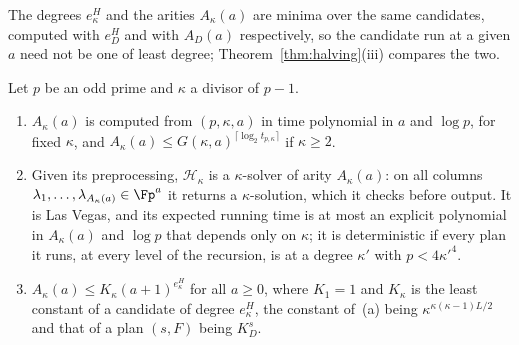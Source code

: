 The degrees $e^H_\kappa$ and the arities $A_\kappa(a)$ are minima over the same candidates, computed with $e^H_D$ and with $A_D(a)$ respectively, so the candidate run at a given $a$ need not be one of least degree; Theorem~\ref{thm:halving}(iii) compares the two.

\begin{theorem}[Schedule~1H]
\label{thm:halving}
Let $p$ be an odd prime and $\kappa$ a divisor of $p-1$.
\begin{enumerate}[label=\textup{(\roman*)},leftmargin=2em]
  \item $A_\kappa(a)$ is computed from $(p,\kappa,a)$ in time polynomial in $a$ and $\log p$, for fixed $\kappa$, and $A_\kappa(a) \le G(\kappa,a)^{\lceil\log_2 t_{p,\kappa}\rceil}$ if $\kappa \ge 2$.
  \item Given its preprocessing, $\mathcal H_\kappa$ is a $\kappa$-solver of arity $A_\kappa(a)$: on all columns $\lambda_1,\dots,\lambda_{A_\kappa(a)} \in \Fp^a$ it returns a $\kappa$-solution, which it checks before output. It is Las Vegas, and its expected running time is at most an explicit polynomial in $A_\kappa(a)$ and $\log p$ that depends only on $\kappa$; it is deterministic if every plan it runs, at every level of the recursion, is at a degree $\kappa'$ with $p < 4\kappa'^4$.
  \item $A_\kappa(a) \le K_\kappa(a+1)^{e^H_\kappa}$ for all $a \ge 0$, where $K_1 = 1$ and $K_\kappa$ is the least constant of a candidate of degree $e^H_\kappa$, the constant of~(a) being $\kappa^{\kappa(\kappa-1)L/2}$ and that of a plan $(s,F)$ being $K_D^s$.
\end{enumerate}
\end{theorem}

